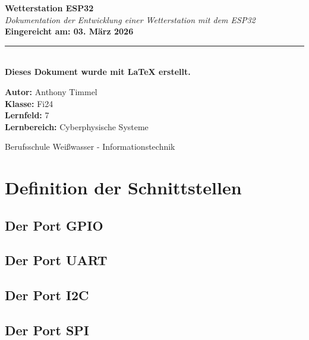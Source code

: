 \documentclass[18pt]{article}
\begin{document}
\begin{titlepage}
	\centering
	\vspace{2cm}
	{\Huge \bfseries Wetterstation ESP32\\}
	\vspace{1cm}
	{\Large \itshape Dokumentation der Entwicklung einer Wetterstation mit dem ESP32\\}
	\vspace{3cm}
	{\bfseries Eingereicht am: 03. März 2026\\}
	\vspace{0.5cm}
	\rule{10cm}{1pt}\\
	\vspace{0.5cm}
	{\bfseries Dieses Dokument wurde mit \LaTeX{} erstellt.\\}
	
	\vfill
	
	\begin{flushleft}
		\large
		\textbf{Autor:} Anthony Timmel\\
		\textbf{Klasse:} Fi24\\
		\textbf{Lernfeld:} 7\\
		\textbf{Lernbereich:} Cyberphysische Systeme\\
	\end{flushleft}
	\vspace{3cm}
	{\large Berufsschule Weißwasser - Informationstechnik}
	
\end{titlepage}
\newpage
\tableofcontents
\newpage

\section{Definition der Schnittstellen}
\subsection[GPIO]{Der Port GPIO}
\subsection[UART]{Der Port UART}
\subsection[I2C]{Der Port I2C}
\subsection[SPI]{Der Port SPI}
\end{document}
